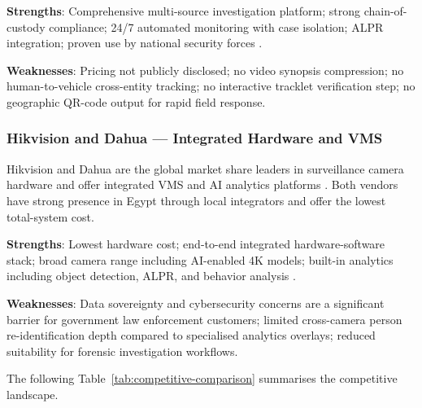 \textbf{Strengths}: Comprehensive multi-source investigation platform; strong chain-of-custody compliance; 24/7 automated monitoring with case isolation; ALPR integration; proven use by national security forces \cite{intelion_forensic, intelion_tecnosec, intelion_dems}.

\textbf{Weaknesses}: Pricing not publicly disclosed; no video synopsis compression; no human-to-vehicle cross-entity tracking; no interactive tracklet verification step; no geographic QR-code output for rapid field response.

\subsubsection{Hikvision and Dahua — Integrated Hardware and VMS}

Hikvision and Dahua are the global market share leaders in surveillance camera hardware and offer integrated VMS and AI analytics platforms \cite{mordorintelligence_cctv}. Both vendors have strong presence in Egypt through local integrators and offer the lowest total-system cost.

\textbf{Strengths}: Lowest hardware cost; end-to-end integrated hardware-software stack; broad camera range including AI-enabled 4K models; built-in analytics including object detection, ALPR, and behavior analysis \cite{mordorintelligence_cctv}.

\textbf{Weaknesses}: Data sovereignty and cybersecurity concerns are a significant barrier for government law enforcement customers; limited cross-camera person re-identification depth compared to specialised analytics overlays; reduced suitability for forensic investigation workflows.

The following Table~\ref{tab:competitive-comparison} summarises the competitive landscape.

